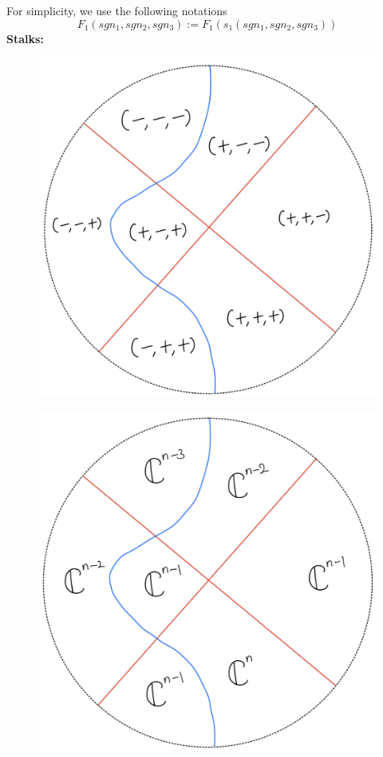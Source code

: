 For simplicity, we use the following notations
\[
F_1(sgn_1,sgn_2,sgn_3):= F_1(s_1(sgn_1,sgn_2,sgn_3))
\]
\textbf{Stalks:}
\begin{figure}[H]
    \centering
    \includegraphics[scale = 0.95]{diagrams/lemma4/31.png}
    \caption{}
    \label{fig:your-label}
\end{figure}
\begin{figure}[H]
    \centering
    \includegraphics[scale = 0.95]{diagrams/cobord'4/32.png}
    \caption{}
    \label{fig:your-label}
\end{figure}
